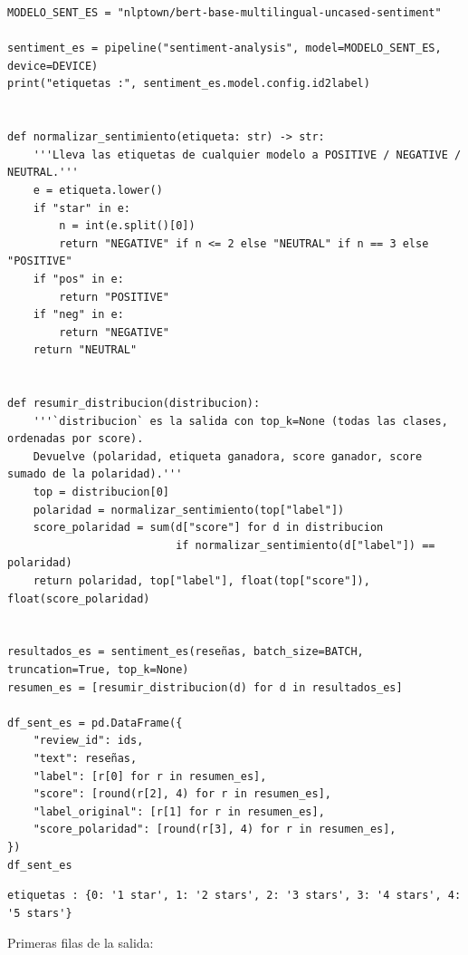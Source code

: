 \documentclass[12pt,a4paper]{article}
\begin{document}
\begin{lstlisting}[style=codigo]
MODELO_SENT_ES = "nlptown/bert-base-multilingual-uncased-sentiment"

sentiment_es = pipeline("sentiment-analysis", model=MODELO_SENT_ES, device=DEVICE)
print("etiquetas :", sentiment_es.model.config.id2label)


def normalizar_sentimiento(etiqueta: str) -> str:
    '''Lleva las etiquetas de cualquier modelo a POSITIVE / NEGATIVE / NEUTRAL.'''
    e = etiqueta.lower()
    if "star" in e:
        n = int(e.split()[0])
        return "NEGATIVE" if n <= 2 else "NEUTRAL" if n == 3 else "POSITIVE"
    if "pos" in e:
        return "POSITIVE"
    if "neg" in e:
        return "NEGATIVE"
    return "NEUTRAL"


def resumir_distribucion(distribucion):
    '''`distribucion` es la salida con top_k=None (todas las clases, ordenadas por score).
    Devuelve (polaridad, etiqueta ganadora, score ganador, score sumado de la polaridad).'''
    top = distribucion[0]
    polaridad = normalizar_sentimiento(top["label"])
    score_polaridad = sum(d["score"] for d in distribucion
                          if normalizar_sentimiento(d["label"]) == polaridad)
    return polaridad, top["label"], float(top["score"]), float(score_polaridad)


resultados_es = sentiment_es(reseñas, batch_size=BATCH, truncation=True, top_k=None)
resumen_es = [resumir_distribucion(d) for d in resultados_es]

df_sent_es = pd.DataFrame({
    "review_id": ids,
    "text": reseñas,
    "label": [r[0] for r in resumen_es],
    "score": [round(r[2], 4) for r in resumen_es],
    "label_original": [r[1] for r in resumen_es],
    "score_polaridad": [round(r[3], 4) for r in resumen_es],
})
df_sent_es
\end{lstlisting}

\begin{lstlisting}[style=salida]
etiquetas : {0: '1 star', 1: '2 stars', 2: '3 stars', 3: '4 stars', 4: '5 stars'}
\end{lstlisting}

Primeras filas de la salida:
\end{document}
